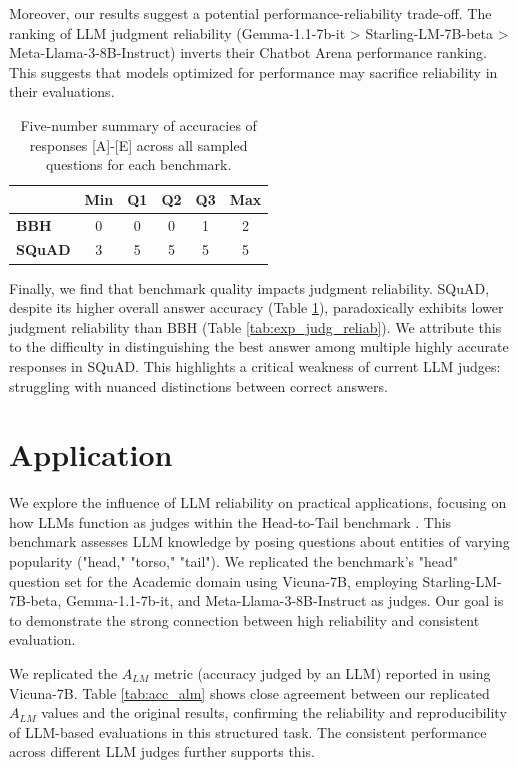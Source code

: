 \documentclass[11pt]{article}
\begin{document}
Moreover, our results suggest a potential performance-reliability trade-off. The ranking of LLM judgment reliability (Gemma-1.1-7b-it > Starling-LM-7B-beta > Meta-Llama-3-8B-Instruct) inverts their Chatbot Arena performance ranking. This suggests that models optimized for performance may sacrifice reliability in their evaluations.



\begin{table}[t]
    \centering
    \begin{tabular}{lccccc}
          & \textbf{Min} & \textbf{Q1} & \textbf{Q2} & \textbf{Q3} & \textbf{Max} \\
         \midrule
         \textbf{BBH} & 0 & 0 & 0 & 1 & 2 \\
         \textbf{SQuAD} & 3 & 5 & 5 & 5 & 5 \\
         \bottomrule
    \end{tabular}
    \caption{Five-number summary of accuracies of responses [A]-[E] across all sampled questions for each benchmark.}
    \label{tab:bench_acc}
\end{table}


Finally, we find that benchmark quality impacts judgment reliability. SQuAD, despite its higher overall answer accuracy (Table \ref{tab:bench_acc}), paradoxically exhibits lower judgment reliability than BBH (Table \ref{tab:exp_judg_reliab}). We attribute this to the difficulty in distinguishing the best answer among multiple highly accurate responses in SQuAD. This highlights a critical weakness of current LLM judges: struggling with nuanced distinctions between correct answers.


\section{Application}

We explore the influence of LLM reliability on practical applications, focusing on how LLMs function as judges within the Head-to-Tail benchmark \citep{sun2023head}. This benchmark assesses LLM knowledge by posing questions about entities of varying popularity ("head," "torso," "tail"). We replicated the benchmark's "head" question set for the Academic domain using Vicuna-7B, employing Starling-LM-7B-beta, Gemma-1.1-7b-it, and Meta-Llama-3-8B-Instruct as judges. Our goal is to demonstrate the strong connection between high reliability and consistent evaluation.

We replicated the $A_{LM}$ metric (accuracy judged by an LLM) reported in \citet{sun2023head} using Vicuna-7B. Table \ref{tab:acc_alm} shows close agreement between our replicated $A_{LM}$ values and the original results, confirming the reliability and reproducibility of LLM-based evaluations in this structured task. The consistent performance across different LLM judges further supports this.
\end{document}
